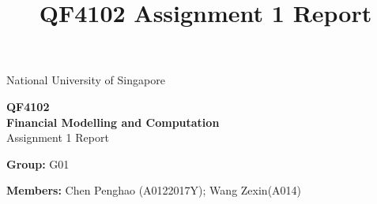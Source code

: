 \documentclass[12pt]{article}
\title{QF4102 Assignment 1 Report}
\begin{document}
\begin{center}
\large National University of Singapore

\Large \textbf{QF4102} \\
\vspace{2mm}
\Large \textbf{Financial Modelling and Computation}
\small \\
\Large Assignment 1 Report\\
\end{center}
\normalsize

\noindent\textbf{Group: } G01 

\noindent\textbf{Members: } Chen Penghao (A0122017Y); Wang Zexin(A014)

\section{}

\section{}

\section{}
\end{document}

